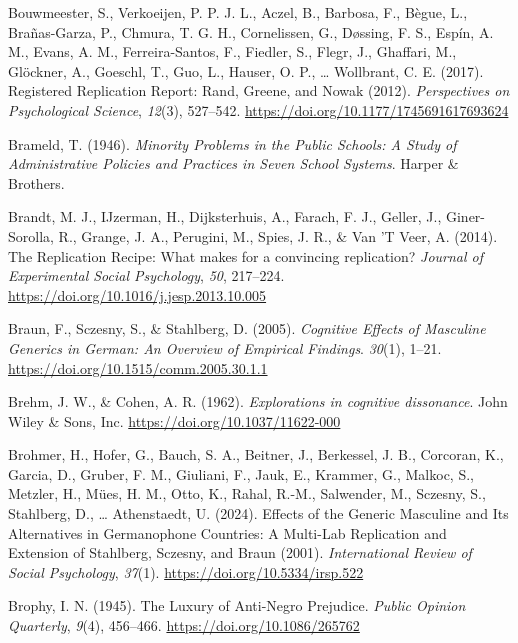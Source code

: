 \documentclass[
  letterpaper,
]{book}
\newlength{\cslhangindent}
\newenvironment{CSLReferences}[2] %
 {\begin{list}{}{%
  \setlength{\itemindent}{0pt}
  \setlength{\leftmargin}{0pt}
  \setlength{\parsep}{0pt}
  \ifodd #1
   \setlength{\leftmargin}{\cslhangindent}
   \setlength{\itemindent}{-1\cslhangindent}
  \fi
  \setlength{\itemsep}{#2\baselineskip}}}
 {\end{list}}
\begin{document}
\begin{CSLReferences}{1}{0}
Bouwmeester, S., Verkoeijen, P. P. J. L., Aczel, B., Barbosa, F., Bègue,
L., Brañas-Garza, P., Chmura, T. G. H., Cornelissen, G., Døssing, F. S.,
Espín, A. M., Evans, A. M., Ferreira-Santos, F., Fiedler, S., Flegr, J.,
Ghaffari, M., Glöckner, A., Goeschl, T., Guo, L., Hauser, O. P.,
\ldots{} Wollbrant, C. E. (2017). Registered {Replication} {Report}:
{Rand}, {Greene}, and {Nowak} (2012). \emph{Perspectives on
Psychological Science}, \emph{12}(3), 527--542.
\url{https://doi.org/10.1177/1745691617693624}

Brameld, T. (1946). \emph{Minority {Problems} in the {Public} {Schools}:
{A} {Study} of {Administrative} {Policies} and {Practices} in {Seven}
{School} {Systems}}. Harper \& Brothers.

Brandt, M. J., IJzerman, H., Dijksterhuis, A., Farach, F. J., Geller,
J., Giner-Sorolla, R., Grange, J. A., Perugini, M., Spies, J. R., \& Van
'T Veer, A. (2014). The {Replication} {Recipe}: {What} makes for a
convincing replication? \emph{Journal of Experimental Social
Psychology}, \emph{50}, 217--224.
\url{https://doi.org/10.1016/j.jesp.2013.10.005}

Braun, F., Sczesny, S., \& Stahlberg, D. (2005). \emph{Cognitive
{Effects} of {Masculine} {Generics} in {German}: {An} {Overview} of
{Empirical} {Findings}}. \emph{30}(1), 1--21.
\url{https://doi.org/10.1515/comm.2005.30.1.1}

Brehm, J. W., \& Cohen, A. R. (1962). \emph{Explorations in cognitive
dissonance}. John Wiley \& Sons, Inc.
\url{https://doi.org/10.1037/11622-000}

Brohmer, H., Hofer, G., Bauch, S. A., Beitner, J., Berkessel, J. B.,
Corcoran, K., Garcia, D., Gruber, F. M., Giuliani, F., Jauk, E.,
Krammer, G., Malkoc, S., Metzler, H., Mües, H. M., Otto, K., Rahal,
R.-M., Salwender, M., Sczesny, S., Stahlberg, D., \ldots{} Athenstaedt,
U. (2024). Effects of the {Generic} {Masculine} and {Its} {Alternatives}
in {Germanophone} {Countries}: {A} {Multi}-{Lab} {Replication} and
{Extension} of {Stahlberg}, {Sczesny}, and {Braun} (2001).
\emph{International Review of Social Psychology}, \emph{37}(1).
\url{https://doi.org/10.5334/irsp.522}

Brophy, I. N. (1945). The {Luxury} of {Anti}-{Negro} {Prejudice}.
\emph{Public Opinion Quarterly}, \emph{9}(4), 456--466.
\url{https://doi.org/10.1086/265762}


\end{CSLReferences}
\end{document}
